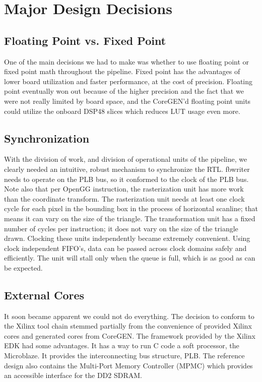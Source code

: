 \documentclass[letterpaper,10pt]{article}
\begin{document}
\section{Major Design Decisions}

\subsection{Floating Point vs. Fixed Point}
One of the main decisions we had to make was whether to use floating point or fixed point math throughout the pipeline. Fixed point has the advantages of lower board utilization and faster performance, at the cost of precision. Floating point eventually won out because of the higher precision and the fact that we were not really limited by board space, and the CoreGEN'd floating point units could utilize the onboard DSP48 slices which reduces LUT usage even more.

\subsection{Synchronization}
With the division of work, and division of operational units of the pipeline, we clearly needed an intuitive, robust mechanism to synchronize the RTL.  fbwriter needs to operate on the PLB bus, so it conformed to the clock of the PLB bus.  Note also that per OpenGG instruction, the rasterization unit has more work than the coordinate transform.  The rasterization unit needs at least one clock cycle for each pixel in the bounding box in the process of horizontal scanline; that means it can vary on the size of the triangle.  The transformation unit has a fixed number of cycles per instruction; it does not vary on the size of the triangle drawn.  Clocking these units independently became extremely convenient.  Using clock independent FIFO's, data can be passed across clock domains safely and efficiently.  The unit will stall only when the queue is full, which is as good as can be expected.

\subsection{External Cores}
It soon became apparent we could not do everything. The decision to conform to the Xilinx tool chain stemmed partially from the convenience of provided Xilinx cores and generated cores from CoreGEN.  The framework provided by the Xilinx EDK had some advantages.  It has a way to run C code a soft processor, the Microblaze.  It provides the interconnecting bus structure, PLB.  The reference design also contains the Multi-Port Memory Controller (MPMC) which provides an accessible interface for the DD2 SDRAM.  
\end{document}
